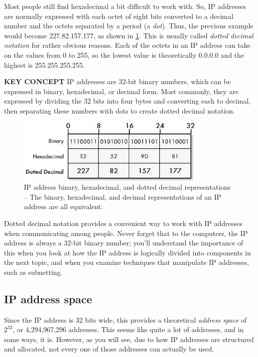 Most people still find hexadecimal a bit difficult to work with.
So, IP addresses are normally expressed with each octet of eight bits converted to a
decimal number and the octets separated by a period (a \emph{dot}).
Thus, the previous example would become 227.82.157.177, as shown in \cref{fig:ip-address-notation}.
This is usually called {\emph{dotted decimal notation}} for rather
obvious reasons. Each of the octets in an IP address can take on the
values from 0 to 255, so the lowest value is theoretically 0.0.0.0 and
the highest is 255.255.255.255.

{\textbf{KEY CONCEPT}} IP addresses are 32-bit binary numbers, which can
be expressed in binary, hexadecimal, or decimal form. Most commonly,
they are expressed by dividing the 32 bits into four bytes and
converting each to decimal, then separating these numbers with dots to
create dotted decimal notation.

\begin{figure}
   \centering
   \includegraphics[width=.7\textwidth]{images/ip-address-notation.jpg}
   \caption{IP address binary, hexadecimal, and dotted decimal representations -- The binary, hexadecimal, and decimal representations of an IP address are all equivalent.}
   \label{fig:ip-address-notation}
\end{figure}

Dotted decimal notation provides a convenient way to work with IP addresses when communicating among people.
Never forget that to the computers, the IP address is always a 32-bit binary
number; you'll understand the importance of this when you look at how
the IP address is logically divided into components in the next topic,
and when you examine techniques that manipulate IP addresses, such as
subnetting.



\subsection{IP address space}

Since the IP address is 32 bits wide, this provides a theoretical {\emph{address
space}} of $2^{32}$, or 4,294,967,296 addresses.
This seems like quite a lot of addresses, and in some ways, it is.
However, as you will see, due to how IP addresses are structured and allocated, not every one of those addresses can actually be used.

